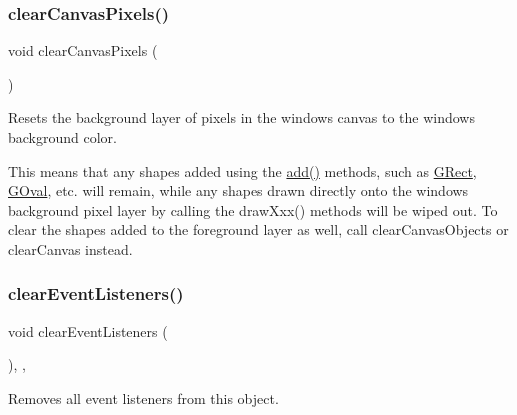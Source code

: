\subsubsection{\texorpdfstring{clear\+Canvas\+Pixels()}{clearCanvasPixels()}}
{\footnotesize\ttfamily void clear\+Canvas\+Pixels (\begin{DoxyParamCaption}{ }\end{DoxyParamCaption})\hspace{0.3cm}{\ttfamily [virtual]}}



Resets the background layer of pixels in the window\textquotesingle{}s canvas to the window\textquotesingle{}s background color. 

This means that any shapes added using the \mbox{\hyperlink{classsgl_1_1GWindow_a6f99b7c841256dbdc5acaafbbca4e685}{add()}} methods, such as \mbox{\hyperlink{classsgl_1_1GRect}{G\+Rect}}, \mbox{\hyperlink{classsgl_1_1GOval}{G\+Oval}}, etc. will remain, while any shapes drawn directly onto the window\textquotesingle{}s background pixel layer by calling the draw\+Xxx() methods will be wiped out. To clear the shapes added to the foreground layer as well, call clear\+Canvas\+Objects or clear\+Canvas instead. \mbox{\label{classsgl_1_1GObservable_a80cfa040459ff53594adbd6a51ec8f43}} 
\subsubsection{\texorpdfstring{clear\+Event\+Listeners()}{clearEventListeners()}}
{\footnotesize\ttfamily void clear\+Event\+Listeners (\begin{DoxyParamCaption}{ }\end{DoxyParamCaption})\hspace{0.3cm}{\ttfamily [protected]}, {\ttfamily [virtual]}, {\ttfamily [inherited]}}



Removes all event listeners from this object. 

\mbox{\label{classsgl_1_1GWindow_a47f0cc45498a78757fa4d0e6befc2981}} 
